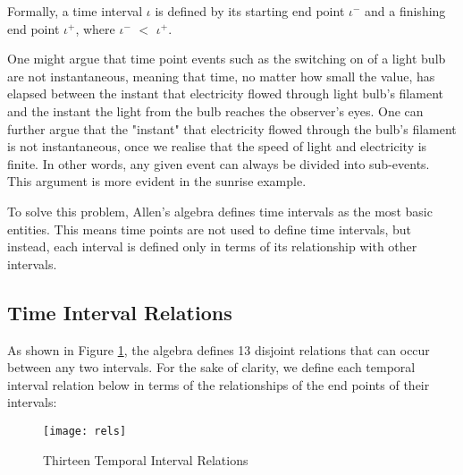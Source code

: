 \documentclass[11pt]{report}
\begin{document}
        Formally, a time interval $\iota$ is defined by its starting end point
        $\iota^-$ and a finishing end point $\iota^+$, where $\iota^-$ $<$
        $\iota^+$.

        One might argue that time point events such as the switching on of a
        light bulb are not instantaneous, meaning that time, no matter how
        small the value, has elapsed between the instant that electricity
        flowed through light bulb's filament and the instant the light from
        the bulb reaches the observer's eyes. One can further argue that the
        "instant" that electricity flowed through the bulb's filament is not
        instantaneous, once we realise that the speed of light and electricity
        is finite. In other words, any given event can always be divided into
        sub-events. This argument is more evident in the sunrise example.

        To solve this problem, Allen's algebra defines time intervals as the
        most basic entities. This means time points are not used to define
        time intervals, but instead, each interval is defined only in terms
        of its relationship with other intervals.

      \subsection{Time Interval Relations}
        \label{subs-tempo-inrel}

        As shown in Figure \ref{figu-tempo-13rel}, the algebra defines 13
        disjoint relations that can occur between any two intervals. For
        the sake of clarity, we define each temporal interval relation
        below in terms of the relationships of the end points of their
        intervals:

        \begin{figure}[tbhp]
          \begin{center}
            \texttt{[image: rels]}
            \caption{Thirteen Temporal Interval Relations}
            \label{figu-tempo-13rel}
          \end{center}
        \end{figure}
\end{document}
